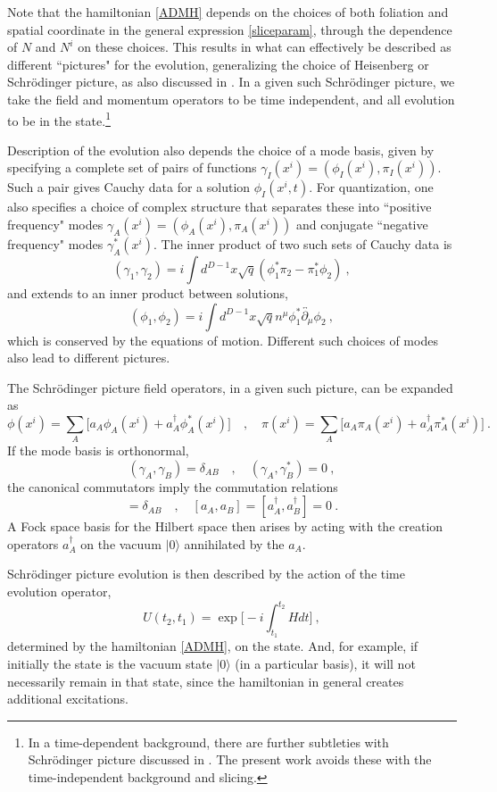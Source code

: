 \documentclass[11pt]{article}
\numberwithin{equation}{section}
\newcommand{\beq}{\begin{equation}}
\newcommand{\eeq}{\end{equation}}
\begin{document}
Note that the hamiltonian \eqref{ADMH} depends on the choices of both foliation and spatial coordinate in the general expression
\eqref{sliceparam}, through the dependence of $N$ and $N^i$ on these choices.  This results in what can effectively be described as different ``pictures" for the evolution, generalizing the choice of Heisenberg or Schr\"odinger picture, as also discussed in \cite{SE2d}.  In a given such Schr\"odinger picture, we take the field and momentum operators to be time independent, and all evolution to be in the state.\footnote{In a time-dependent background, there are further subtleties with Schr\"odinger picture discussed in \cite{ToVa,CMOV,CFMM,AgAs,MuOe}. The present work avoids these with the time-independent background and slicing.}  

Description of the evolution also depends the choice of a mode basis, given by specifying a complete set of pairs of functions $\gamma_I(x^i)=(\phi_I(x^i),\pi_I(x^i))$.  Such a pair gives Cauchy data for a solution $\phi_I(x^i,t)$.  For quantization, one also specifies  a choice of complex structure 
\cite{More,Kay,AgAs} that separates these into ``positive frequency" modes $\gamma_A(x^i)=(\phi_A(x^i),\pi_A(x^i))$ and conjugate ``negative frequency" modes $\gamma_A^*(x^i)$.  
The inner product of two such sets of Cauchy data is 
\beq
(\gamma_1, \gamma_2)= i\int d^{D-1}x \sqrt{q}(\phi_1^*\pi_2-\pi_1^*\phi_2)\ ,
\eeq
and extends to an inner product between solutions,  
\beq\label{InnerProduct}
(\phi_1,\phi_2) = i \int d^{D-1} x \sqrt{q} n^\mu \phi_1^*\overleftrightarrow{\partial_\mu} \phi_2\ ,
\eeq
which is conserved by the equations of motion.  Different such choices of modes also lead to different pictures.

The Schr\"odinger picture field operators, in a given such picture, can be expanded as
\beq\label{opexps}
\phi(x^i) = \sum_A \big[a_A \phi_A(x^i)+a_A^{\dagger} \phi_A^*(x^i)\big]\quad ,\quad \pi(x^i) = \sum_A \big[a_A\pi_A(x^i)+a_A^{\dagger} \pi_A^*(x^i)\big]\ .
\eeq
If the mode basis is orthonormal,
\beq
(\gamma_A,\gamma_B) = \delta_{AB}\quad , \quad (\gamma_A,\gamma_B^*) = 0\ ,
\eeq 
the canonical commutators imply the commutation relations
\beq
[a_A, a_B^{\dagger}] = \delta_{AB}\quad ,\quad  [a_A, a_B]=[a_A^{\dagger}, a_B^{\dagger}] = 0\ .
\eeq
A Fock space basis for the Hilbert space then arises by acting with the creation operators $a_A^\dagger$ on the vacuum $|0\rangle$ annihilated by the $a_A$.  

Schr\"odinger picture evolution is then described by the action of the time evolution operator,
\beq
U(t_2, t_1)= \exp{\bigg[-i\int_{t_1}^{t_2} H dt\bigg]}\ ,
\eeq
determined by the hamiltonian \eqref{ADMH}, on the state.  And, for example, if initially the state is the vacuum state $|0\rangle$ (in a particular basis), it will not necessarily remain in that state, since the hamiltonian in general creates additional excitations.
\end{document}
